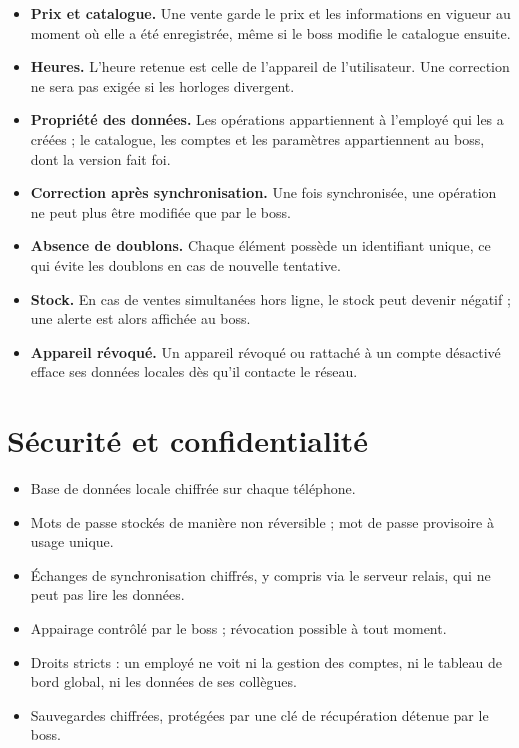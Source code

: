\documentclass[11pt,a4paper]{article}
\begin{document}
	\begin{itemize}[leftmargin=*]
		\item \textbf{Prix et catalogue.} Une vente garde le prix et les informations en vigueur au moment où elle a été enregistrée, même si le boss modifie le catalogue ensuite.
		\item \textbf{Heures.} L'heure retenue est celle de l'appareil de l'utilisateur. Une correction ne sera pas exigée si les horloges divergent.
		\item \textbf{Propriété des données.} Les opérations appartiennent à l'employé qui les a créées ; le catalogue, les comptes et les paramètres appartiennent au boss, dont la version fait foi.
		\item \textbf{Correction après synchronisation.} Une fois synchronisée, une opération ne peut plus être modifiée que par le boss.
		\item \textbf{Absence de doublons.} Chaque élément possède un identifiant unique, ce qui évite les doublons en cas de nouvelle tentative.
		\item \textbf{Stock.} En cas de ventes simultanées hors ligne, le stock peut devenir négatif ; une alerte est alors affichée au boss.
		\item \textbf{Appareil révoqué.} Un appareil révoqué ou rattaché à un compte désactivé efface ses données locales dès qu'il contacte le réseau.
	\end{itemize}
	
	\section{Sécurité et confidentialité}
	\begin{itemize}[leftmargin=*]
		\item Base de données locale chiffrée sur chaque téléphone.
		\item Mots de passe stockés de manière non réversible ; mot de passe provisoire à usage unique.
		\item Échanges de synchronisation chiffrés, y compris via le serveur relais, qui ne peut pas lire les données.
		\item Appairage contrôlé par le boss ; révocation possible à tout moment.
		\item Droits stricts : un employé ne voit ni la gestion des comptes, ni le tableau de bord global, ni les données de ses collègues.
		\item Sauvegardes chiffrées, protégées par une clé de récupération détenue par le boss.
	\end{itemize}
	
\end{document}
